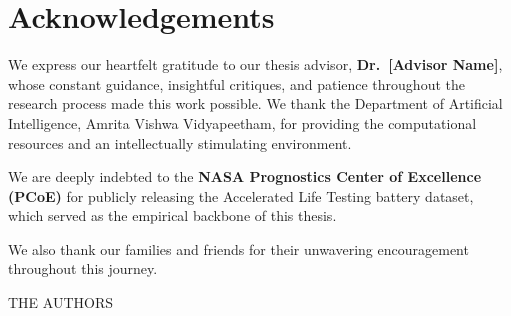 \documentclass[a4paper, 12pt]{report}
\theoremstyle{definition}
\begin{document}
\chapter*{Acknowledgements}

We express our heartfelt gratitude to our thesis advisor,
\textbf{Dr.~[Advisor Name]}, whose constant guidance, insightful
critiques, and patience throughout the research process made this work
possible. We thank the Department of Artificial Intelligence, Amrita
Vishwa Vidyapeetham, for providing the computational resources and an
intellectually stimulating environment.

We are deeply indebted to the \textbf{NASA Prognostics Center of
Excellence (PCoE)} for publicly releasing the Accelerated Life Testing
battery dataset, which served as the empirical backbone of this thesis.

We also thank our families and friends for their unwavering
encouragement throughout this journey.

\vspace{1cm}
\begin{flushright}
  THE AUTHORS
\end{flushright}

\listoffigures
{}
\listoftables
{}

\newpage
\end{document}
